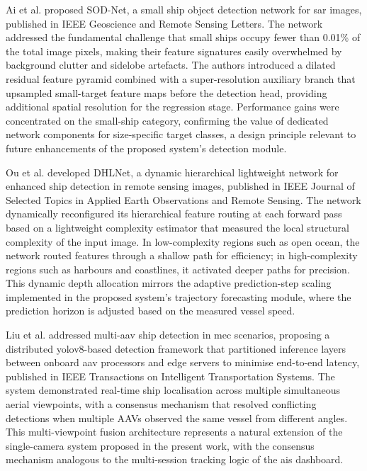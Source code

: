 Ai et al. \cite{Ai2025} proposed SOD-Net, a small ship object detection network
for \gls{sar} images, published in IEEE Geoscience and Remote Sensing Letters. The
network addressed the fundamental challenge that small ships occupy fewer than
0.01\% of the total image pixels, making their feature signatures easily
overwhelmed by background clutter and sidelobe artefacts. The authors introduced
a dilated residual feature pyramid combined with a super-resolution auxiliary
branch that upsampled small-target feature maps before the detection head,
providing additional spatial resolution for the regression stage. Performance
gains were concentrated on the small-ship category, confirming the value of
dedicated network components for size-specific target classes, a design principle
relevant to future enhancements of the proposed system's detection module.
 
Ou et al. \cite{Ou2025} developed DHLNet, a dynamic hierarchical lightweight
network for enhanced ship detection in remote sensing images, published in IEEE
Journal of Selected Topics in Applied Earth Observations and Remote Sensing.
The network dynamically reconfigured its hierarchical feature routing at each
forward pass based on a lightweight complexity estimator that measured the local
structural complexity of the input image. In low-complexity regions such as open
ocean, the network routed features through a shallow path for efficiency; in
high-complexity regions such as harbours and coastlines, it activated deeper paths
for precision. This dynamic depth allocation mirrors the adaptive prediction-step
scaling implemented in the proposed system's trajectory forecasting module, where
the prediction horizon is adjusted based on the measured vessel speed.
 
Liu et al. \cite{Liu2025c} addressed multi-\gls{aav}
ship detection in \gls{mec} scenarios, proposing a distributed
\gls{yolov8}-based detection framework that partitioned inference layers between
onboard \gls{aav} processors and edge servers to minimise end-to-end latency, published
in IEEE Transactions on Intelligent Transportation Systems. The system demonstrated
real-time ship localisation across multiple simultaneous aerial viewpoints, with
a consensus mechanism that resolved conflicting detections when multiple AAVs
observed the same vessel from different angles. This multi-viewpoint fusion
architecture represents a natural extension of the single-camera system proposed
in the present work, with the consensus mechanism analogous to the multi-session
tracking logic of the \gls{ais} dashboard.
 
